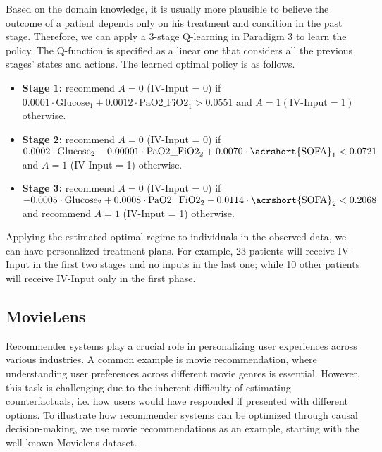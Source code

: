Based on the domain knowledge, it is usually more plausible to believe the outcome of a patient depends only on his treatment and condition in the past stage. Therefore, we can apply a 3-stage Q-learning in Paradigm 3 to learn the policy. The Q-function is specified as a linear one that considers all the previous stages' states and actions. The learned optimal policy is as follows. 
\begin{itemize}
    \item \textbf{Stage 1:} recommend \( A = 0 \) (IV-Input = 0) if 
        $ 0.0001 \cdot \text{Glucose}_1 + 0.0012 \cdot \text{PaO2\_FiO2}_1 > 0.0551$ and \( A = 1 (\text{IV-Input} = 1)\)  otherwise.     
    \item \textbf{Stage 2:} recommend \( A = 0 \) (IV-Input = 0) if 
        $ 0.0002 \cdot \text{Glucose}_2 - 0.00001 \cdot \text{PaO2\_FiO2}_2 + 0.0070 \cdot \text{\acrshort{SOFA}}_1 < 0.0721 $ and \( A = 1 \) (IV-Input = 1)  otherwise.        
    \item \textbf{Stage 3:} recommend \( A = 0 \) (IV-Input = 0) if 
        $ -0.0005 \cdot \text{Glucose}_2 + 0.0008 \cdot \text{PaO2\_FiO2}_2 - 0.0114 \cdot \text{\acrshort{SOFA}}_2 < 0.2068$ and recommend \( A = 1 \) (IV-Input = 1)  otherwise.    
\end{itemize}

Applying the estimated optimal regime to individuals in the observed data, we can have personalized treatment plans. 
For example, 23 patients will receive IV-Input in the first two stages and no inputs in the last one; while 10 other patients will receive IV-Input only in the first phase. 











\subsection{MovieLens}

Recommender systems play a crucial role in personalizing user experiences across various industries. A common example is movie recommendation, where understanding user preferences across different movie genres is essential. However, this task is challenging due to the inherent difficulty of estimating counterfactuals, i.e. how users would have responded if presented with different options. To illustrate how recommender systems can be optimized through causal decision-making, we use movie recommendations as an example, starting with the well-known Movielens dataset.


